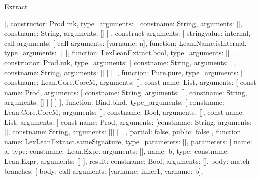 \begin{lexlean}{Extract}
\begin{toolingmodule}
{{{{{{{                      ],
                      constructor: Prod.mk,
                      type_arguments: [
                        const{name: String, arguments: []},
                        const{name: String, arguments: []}
                      ]
                    },
                    construct{
                      arguments: [
                        string{value: internal},
                        call{
                          arguments: [
                            call{
                              arguments: [var{name: n}],
                              function: Lean.Name.isInternal,
                              type_arguments: []
                            }
                          ],
                          function: LexLeanExtract.bool,
                          type_arguments: []
                        }
                      ],
                      constructor: Prod.mk,
                      type_arguments: [
                        const{name: String, arguments: []},
                        const{name: String, arguments: []}
                      ]
                    }
                  ]
                }
              ],
              function: Pure.pure,
              type_arguments: [
                const{name: Lean.Core.CoreM, arguments: []},
                const{
                  name: List,
                  arguments: [
                    const{
                      name: Prod,
                      arguments: [
                        const{name: String, arguments: []},
                        const{name: String, arguments: []}
                      ]
                    }
                  ]
                }
              ]
            }
          }
        ],
        function: Bind.bind,
        type_arguments: [
          const{name: Lean.Core.CoreM, arguments: []},
          const{name: Bool, arguments: []},
          const{
            name: List,
            arguments: [
              const{
                name: Prod,
                arguments: [const{name: String, arguments: []}, const{name: String, arguments: []}]
              }
            ]
          }
        ]
      },
      partial: false,
      public: false
    },
    function{
      name: LexLeanExtract.sameSignature,
      type_parameters: [],
      parameters: [
        {name: a, type: const{name: Lean.Expr, arguments: []}},
        {name: b, type: const{name: Lean.Expr, arguments: []}}
      ],
      result: const{name: Bool, arguments: []},
      body: match{
        branches: [
          {
            body: call{
              arguments: [var{name: inner1}, var{name: b}],
}}}}}
\end{toolingmodule}
\end{lexlean}
